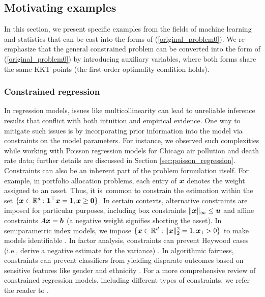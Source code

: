 \documentclass[aos]{imsart}
\numberwithin{equation}{section}
\theoremstyle{plain}
\newcommand{\michael}[1]{\textcolor{red}{Michael:\ #1}}
\begin{document}
\subsection{Motivating examples}
\label{sec:1.1}
In this section, we present specific examples from the fields of machine learning and statistics that can be cast into the forms of (\ref{original_problem0}). We re-emphasize that the general constrained problem can be converted into the form of (\ref{original_problem0}) by introducing auxiliary variables, where both forms share the same KKT points (the first-order optimality condition holds). 

\subsubsection{Constrained regression}
\label{sec_constrained_regression}
In regression models, issues like multicollinearity can lead to unreliable inference results that conflict with both intuition and empirical evidence. One way to mitigate such issues is by incorporating prior information into the model via constraints on the model parameters.
For instance, we observed such complexities while working with Poisson regression models for Chicago air pollution and death rate data; further details are discussed in Section \ref{sec:poisson_regression}.
Constraints can also be an inherent part of the problem formulation itself.
For example, in portfolio allocation problems, each entry of ${\boldsymbol{x}}$ denotes the weight assigned to an asset. Thus, it is~common to constrain the estimation within the set $\{{\boldsymbol{x}}\in\mathbb{R}^d: {\boldsymbol{1}}^\top {\boldsymbol{x}} = 1, {\boldsymbol{x}}\geq {\boldsymbol 0}\}$. In certain contexts, alternative constraints are imposed for particular purposes, including box constraints $\|{\boldsymbol{x}}\|_{\infty}\leq {\boldsymbol{u}}$ and affine constraints $A{\boldsymbol{x}} = {\boldsymbol{b}}$ \cite{Fan2007Variable, Fan2012Vast} (a negative weight signifies shorting the asset). In semiparametric index models, we impose $\{{\boldsymbol{x}}\in\mathbb{R}^d: \|{\boldsymbol{x}}\|_2^2=1, {\boldsymbol{x}}_1>0\}$ to make models identifiable \cite{Na2019High, Na2021High}. In factor analysis, constraints can prevent Heywood cases (i.e., derive a negative estimate for the variance) \cite{Shapiro1985Asymptotic}. In algorithmic fairness, constraints can prevent classifiers from yielding disparate outcomes based on sensitive features like gender and ethnicity \cite{Zafar2019Fairness}. 
For a more comprehensive review of constrained regression models, including different types of constraints, we refer the reader to \cite{Fan2012Vast, shapiro2000asymptotics, du2023high, sen1979asymptotic, Na2021High, dupacova1988asymptotic, Na2019High}.
\end{document}
